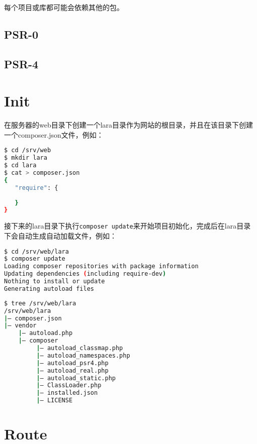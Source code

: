 每个项目或库都可能会依赖其他的包。


\subsection{PSR-0}



\subsection{PSR-4}



\section{Init}


在服务器的web目录下创建一个lara目录作为网站的根目录，并且在该目录下创建一个composer.json文件，例如：

\begin{lstlisting}[language=bash]
$ cd /srv/web
$ mkdir lara
$ cd lara
$ cat > composer.json
{
   "require": {
   
   }
}

\end{lstlisting}

接下来的lara目录下执行\texttt{composer update}来开始项目初始化，完成后在lara目录下会自动生成自动加载文件，例如：

\begin{lstlisting}[language=bash]
$ cd /srv/web/lara
$ composer update
Loading composer repositories with package information
Updating dependencies (including require-dev)
Nothing to install or update
Generating autoload files
\end{lstlisting}

\begin{lstlisting}[language=bash]
$ tree /srv/web/lara
/srv/web/lara
|— composer.json
|— vendor
    |— autoload.php
    |— composer
         |— autoload_classmap.php
         |— autoload_namespaces.php
         |— autoload_psr4.php
         |— autoload_real.php
         |— autoload_static.php
         |— ClassLoader.php
         |— installed.json
         |— LICENSE
\end{lstlisting}





\section{Route}

